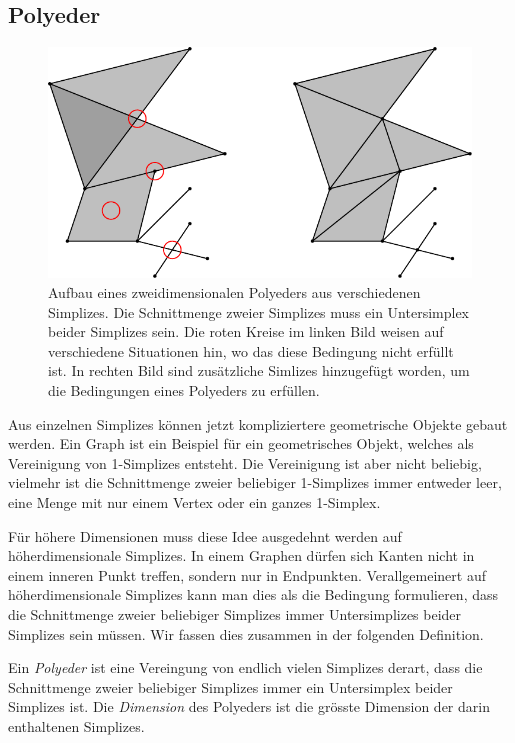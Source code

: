 \subsection{Polyeder}
\begin{figure}
\centering
\includegraphics{chapters/95-homologie/images/polyeder.pdf}
\caption{Aufbau eines zweidimensionalen Polyeders aus
verschiedenen Simplizes.
Die Schnittmenge zweier Simplizes muss ein Untersimplex beider Simplizes
sein.
Die roten Kreise im linken Bild weisen auf verschiedene Situationen
hin, wo das diese Bedingung nicht erfüllt ist.
In rechten Bild sind zusätzliche Simlizes hinzugefügt worden, um
die Bedingungen eines Polyeders zu erfüllen.
\label{buch:homologie:figure:polyeder}}
\end{figure}
Aus einzelnen Simplizes können jetzt kompliziertere geometrische
Objekte gebaut werden.
Ein Graph ist ein Beispiel für ein geometrisches Objekt, welches
als Vereinigung von 1-Simplizes entsteht.
Die Vereinigung ist aber nicht beliebig, vielmehr ist die Schnittmenge
zweier beliebiger 1-Simplizes immer entweder leer, eine Menge 
mit nur einem Vertex oder ein ganzes 1-Simplex.

Für höhere Dimensionen muss diese Idee ausgedehnt werden auf
höherdimensionale Simplizes.
In einem Graphen dürfen sich Kanten nicht in einem inneren Punkt treffen,
sondern nur in Endpunkten.
Verallgemeinert auf höherdimensionale Simplizes kann man dies als die
Bedingung formulieren, dass die Schnittmenge zweier beliebiger
Simplizes immer Untersimplizes beider Simplizes sein müssen.
Wir fassen dies zusammen in der folgenden Definition.

\begin{definition}
%
%
%
Ein {\em Polyeder} ist eine Vereingung von endlich vielen Simplizes derart,
dass die Schnittmenge zweier beliebiger Simplizes immer ein Untersimplex
beider Simplizes ist.
Die {\em Dimension} des Polyeders ist die grösste Dimension der darin
enthaltenen Simplizes.
\end{definition}

